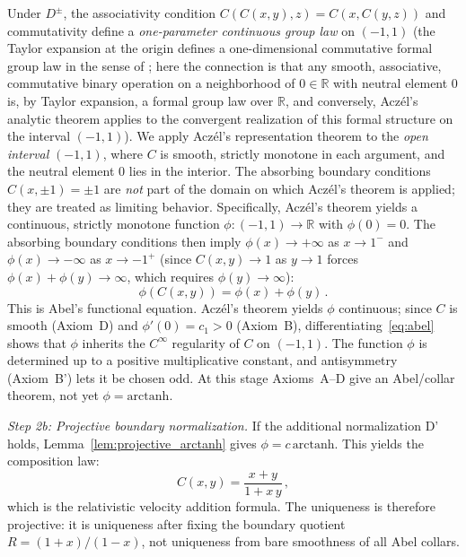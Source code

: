 \documentclass[aps,prd,twocolumn,superscriptaddress,nofootinbib]{revtex4-2}
\begin{document}
Under $D^\pm$, the associativity condition $C(C(x,y),z) = C(x, C(y,z))$ and commutativity define a \textit{one-parameter continuous group law} on $(-1,1)$ (the Taylor expansion at the origin defines a one-dimensional commutative formal group law in the sense of \cite{Hazewinkel1978}; here the connection is that any smooth, associative, commutative binary operation on a neighborhood of $0 \in \mathbb{R}$ with neutral element $0$ is, by Taylor expansion, a formal group law over $\mathbb{R}$, and conversely, Acz\'el's analytic theorem applies to the convergent realization of this formal structure on the interval $(-1,1)$). We apply Acz\'el's representation theorem \cite{Aczel1966} to the \textit{open interval} $(-1,1)$, where $C$ is smooth, strictly monotone in each argument, and the neutral element $0$ lies in the interior. The absorbing boundary conditions $C(x, \pm 1) = \pm 1$ are \textit{not} part of the domain on which Acz\'el's theorem is applied; they are treated as limiting behavior. Specifically, Acz\'el's theorem yields a continuous, strictly monotone function $\phi: (-1,1) \to \mathbb{R}$ with $\phi(0) = 0$. The absorbing boundary conditions then imply $\phi(x) \to +\infty$ as $x \to 1^-$ and $\phi(x) \to -\infty$ as $x \to -1^+$ (since $C(x,y) \to 1$ as $y \to 1$ forces $\phi(x) + \phi(y) \to \infty$, which requires $\phi(y) \to \infty$):
\begin{equation}
\phi(C(x,y)) = \phi(x) + \phi(y)\,.
\label{eq:abel}
\end{equation}
This is Abel's functional equation. Acz\'el's theorem yields $\phi$ continuous; since $C$ is smooth (Axiom~D) and $\phi'(0) = c_1 > 0$ (Axiom~B), differentiating~\eqref{eq:abel} shows that $\phi$ inherits the $C^\infty$ regularity of $C$ on $(-1,1)$. The function $\phi$ is determined up to a positive multiplicative constant, and antisymmetry (Axiom~B') lets it be chosen odd. At this stage Axioms~A--D give an Abel/collar theorem, not yet $\phi=\mathrm{arctanh}$.

\textit{Step 2b: Projective boundary normalization.}
If the additional normalization D' holds, Lemma~\ref{lem:projective_arctanh} gives $\phi=c\,\mathrm{arctanh}$. This yields the composition law:
\begin{equation}
C(x, y) = \frac{x + y}{1 + x\,y}\,,
\label{eq:addition_formula}
\end{equation}
which is the relativistic velocity addition formula. The uniqueness is therefore projective: it is uniqueness after fixing the boundary quotient $R=(1+x)/(1-x)$, not uniqueness from bare smoothness of all Abel collars.
\end{document}
